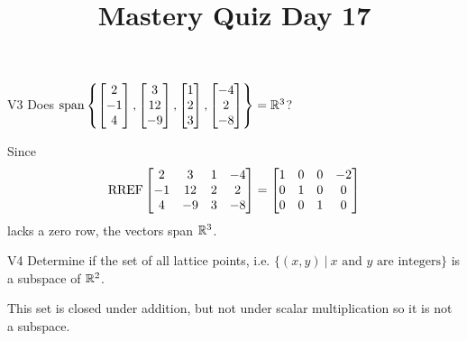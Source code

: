 \documentclass{sbgLAquiz}
\title{Mastery Quiz Day 17 }
\begin{document}
\begin{problem}{V3}
Does
\(
  \operatorname{span}\left\{
    \begin{bmatrix} 2 \\ -1 \\ 4 \end{bmatrix},
    \begin{bmatrix} 3 \\ 12 \\ -9 \end{bmatrix},
    \begin{bmatrix} 1 \\ 2 \\ 3 \end{bmatrix},
    \begin{bmatrix} -4 \\ 2 \\ -8 \end{bmatrix}
  \right\} = \mathbb{R}^3
\)?
\end{problem}
\begin{solution}
Since
\[
  \operatorname{RREF}\begin{bmatrix}
    2 & 3 & 1 & -4 \\
    -1 & 12 & 2 & 2 \\
    4 & -9 & 3 & -8
  \end{bmatrix} =
  \begin{bmatrix}
    1 & 0 & 0 & -2 \\
    0 & 1 & 0 & 0 \\
    0 & 0 & 1 & 0
  \end{bmatrix}
\]
lacks a zero row, the vectors span \(\mathbb{R}^3\).
\end{solution}

\begin{problem}{V4}
Determine if the set of all lattice points, i.e. $\{(x,y)\ \big|\ \text{$x$ and $y$ are integers} \}$ is a subspace of $\mathbb{R}^2$.
\end{problem}
\begin{solution}
This set is closed under addition, but not under scalar multiplication so it is not a subspace.
\end{solution}
\end{document}
